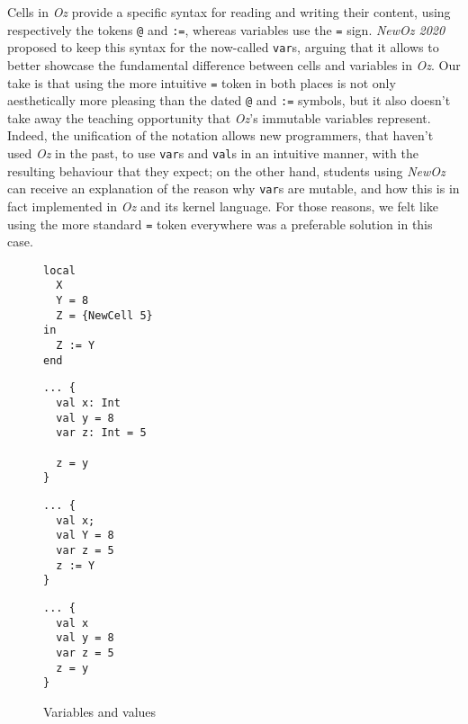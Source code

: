 Cells in \textit{Oz} provide a specific syntax for reading and writing their content, using respectively the tokens \texttt{@} and \texttt{:=}, whereas variables use the \texttt{=} sign.
\textit{NewOz 2020} proposed to keep this syntax for the now-called \texttt{var}s, arguing that it allows to better showcase the fundamental difference between cells and variables in \textit{Oz}.
Our take is that using the more intuitive \texttt{=} token in both places is not only aesthetically more pleasing than the dated \texttt{@} and \texttt{:=} symbols, but it also doesn't take away the teaching opportunity that \textit{Oz}'s immutable variables represent.
Indeed, the unification of the notation allows new programmers, that haven't used \textit{Oz} in the past, to use \texttt{var}s and \texttt{val}s in an intuitive manner, with the resulting behaviour that they expect;
on the other hand, students using \textit{NewOz} can receive an explanation of the reason why \texttt{var}s are mutable, and how this is in fact implemented in \textit{Oz} and its kernel language.
For those reasons, we felt like using the more standard \texttt{=} token everywhere was a preferable solution in this case.
\begin{figure}
    \caption{Variables and values}
    \noindent\begin{minipage}{.49\textwidth}
    \begin{lstlisting}[title={Oz},language=oz]
local
  X
  Y = 8
  Z = {NewCell 5}
in
  Z := Y
end
    \end{lstlisting}
\end{minipage}
\hfill
    \noindent\begin{minipage}{.49\textwidth}
    \begin{lstlisting}[title={Scala/Ozma}]
... {
  val x: Int
  val y = 8
  var z: Int = 5

  z = y
}
    \end{lstlisting}
\end{minipage}
    \noindent\begin{minipage}{.49\textwidth}
    \begin{lstlisting}[title={NewOz 2020},language=newoz]
... {
  val x;
  val Y = 8
  var z = 5
  z := Y
}
    \end{lstlisting}
\end{minipage}
\hfill
    \noindent\begin{minipage}{.49\textwidth}
    \begin{lstlisting}[title={NewOz 2021},language=newoz]
... {
  val x
  val y = 8
  var z = 5
  z = y
}
    \end{lstlisting}
\end{minipage}
\end{figure}

